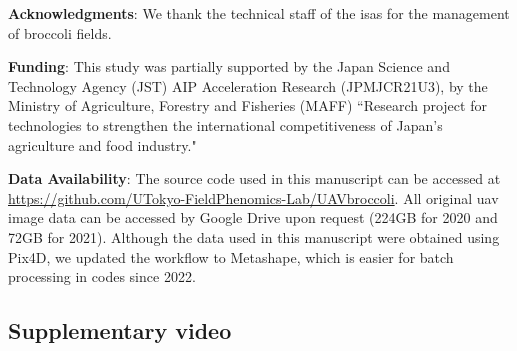 \hspace*{\fill}

\noindent \textbf{Acknowledgments}: We thank the technical staff of the \gls{isas} for the management of broccoli fields. 



\hspace*{\fill}

\noindent \textbf{Funding}: This study was partially supported by the Japan Science and Technology Agency (JST) AIP Acceleration Research (JPMJCR21U3), by the Ministry of Agriculture, Forestry and Fisheries (MAFF) ``Research project for technologies to strengthen the international competitiveness of Japan's agriculture and food industry."



\hspace*{\fill}

\noindent \textbf{Data Availability}: The source code used in this manuscript can be accessed at \url{https://github.com/UTokyo-FieldPhenomics-Lab/UAVbroccoli}. All original \gls{uav} image data can be accessed by Google Drive upon request (224GB for 2020 and 72GB for 2021). Although the data used in this manuscript were obtained using Pix4D, we updated the workflow to Metashape, which is easier for batch processing in codes since 2022.


\appendixsection



\subsection{Supplementary video}
\label{spp:video}

